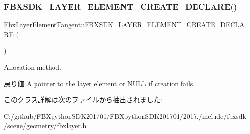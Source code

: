 \subsubsection{\texorpdfstring{F\+B\+X\+S\+D\+K\+\_\+\+L\+A\+Y\+E\+R\+\_\+\+E\+L\+E\+M\+E\+N\+T\+\_\+\+C\+R\+E\+A\+T\+E\+\_\+\+D\+E\+C\+L\+A\+R\+E()}{FBXSDK\_LAYER\_ELEMENT\_CREATE\_DECLARE()}}
{\footnotesize\ttfamily Fbx\+Layer\+Element\+Tangent\+::\+F\+B\+X\+S\+D\+K\+\_\+\+L\+A\+Y\+E\+R\+\_\+\+E\+L\+E\+M\+E\+N\+T\+\_\+\+C\+R\+E\+A\+T\+E\+\_\+\+D\+E\+C\+L\+A\+RE (\begin{DoxyParamCaption}\item[{Layer\+Element\+Tangent}]{ }\end{DoxyParamCaption})}

Allocation method. \begin{DoxyReturn}{戻り値}
A pointer to the layer element or {\ttfamily N\+U\+LL} if creation fails. 
\end{DoxyReturn}


このクラス詳解は次のファイルから抽出されました\+:\begin{DoxyCompactItemize}
\item 
C\+:/github/\+F\+B\+Xpython\+S\+D\+K201701/\+F\+B\+Xpython\+S\+D\+K201701/2017./include/fbxsdk/scene/geometry/\hyperlink{fbxlayer_8h}{fbxlayer.\+h}\end{DoxyCompactItemize}
